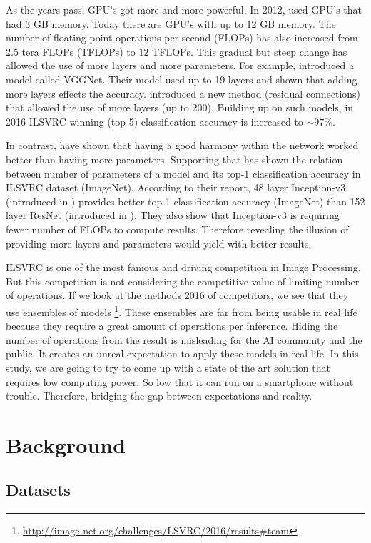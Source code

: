 As the years pass, GPU's got more and more powerful. In 2012, \cite{krizhevsky2012imagenet} used GPU's that had 3 GB memory. Today there are GPU's with up to 12 GB memory. The number of floating point operations per second (FLOPs) has also increased from $2.5$ tera FLOPs (TFLOPs) to $12$ TFLOPs. This gradual but steep change has allowed the use of more layers and more parameters. For example, \cite{Simonyan:2014aa} introduced a model called VGGNet. Their model used up to 19 layers and shown that adding more layers effects the accuracy. \cite{He:2015aa} introduced a new method (residual connections) that allowed the use of more layers (up to 200). Building up on such models, in 2016 ILSVRC winning (top-5) classification accuracy is increased to $\sim 97\%$. 

In contrast, \cite{Szegedy:2014aa} have shown that having a good harmony within the network worked better than having more parameters. Supporting that \cite{Canziani:2016aa} has shown the relation between number of parameters of a model and its top-1 classification accuracy in ILSVRC dataset (ImageNet). According to their report, 48 layer Inception-v3 (introduced in \cite{Szegedy_2016_CVPR}) provides better top-1 classification accuracy (ImageNet) than 152 layer ResNet (introduced in \cite{He:2015aa}). They also show that Inception-v3 is requiring fewer number of FLOPs to compute results. Therefore revealing the illusion of providing more layers and parameters would yield with better results. 

ILSVRC is one of the most famous and driving competition in Image Processing. But this competition is not considering the competitive value of limiting number of operations. If we look at the methods 2016 of competitors, we see that they use ensembles of models \footnote{\url{http://image-net.org/challenges/LSVRC/2016/results\#team}}. These ensembles are far from being usable in real life because they require a great amount of operations per inference. Hiding the number of operations from the result is misleading for the AI community and the public. It creates an unreal expectation to apply these models in real life. In this study, we are going to try to come up with a state of the art solution that requires low computing power. So low that it can run on a smartphone without trouble. Therefore, bridging the gap between expectations and reality.
\section{Background}
\subsection{Datasets}
